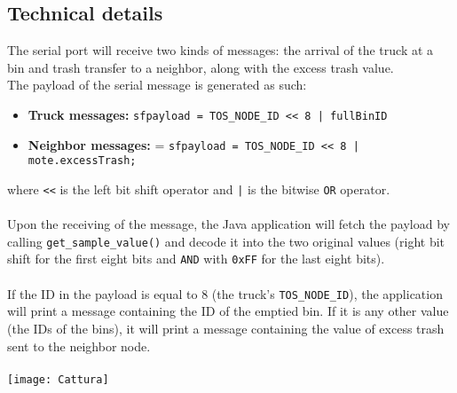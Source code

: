 \documentclass[a4paper,10pt]{article}
\begin{document}
\subsection{Technical details}
The serial port will receive two kinds of messages: the arrival of the truck at a bin and trash transfer to a neighbor, along with the excess trash value.
\\The payload of the serial message is generated as such:
\begin{itemize}
	\item \textbf{Truck messages:} \texttt{sfpayload = TOS\_NODE\_ID << 8 | fullBinID}
	\item \textbf{Neighbor messages:} = \texttt{sfpayload = TOS\_NODE\_ID << 8 | mote.excessTrash;}
\end{itemize}
where \texttt{<<} is the left bit shift operator and \texttt{|} is the bitwise \texttt{OR} operator.
\\ \\Upon the receiving of the message, the Java application will fetch the payload by calling \texttt{get\_sample\_value()} and decode it into the two original values (right bit shift for the first eight bits and \texttt{AND} with \texttt{0xFF} for the last eight bits).
\\ \\  \noindent If the ID in the payload is equal to 8 (the truck's \texttt{TOS\_NODE\_ID}), the application will print a message containing the ID of the emptied bin. If it is any other value (the IDs of the bins), it will print a message containing the value of excess trash sent to the neighbor node. \\ \\
\texttt{[image: Cattura]}
\end{document}
